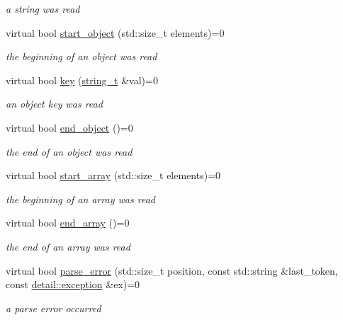 \begin{DoxyCompactItemize}
\begin{DoxyCompactList}\small\item\em a string was read \end{DoxyCompactList}\item 
virtual bool \hyperlink{structnlohmann_1_1json__sax_a0671528b0debb5a348169d61f0382a0f}{start\+\_\+object} (std\+::size\+\_\+t elements)=0
\begin{DoxyCompactList}\small\item\em the beginning of an object was read \end{DoxyCompactList}\item 
virtual bool \hyperlink{structnlohmann_1_1json__sax_a2e0c7ecd80b18d18a8cc76f71cfc2028}{key} (\hyperlink{structnlohmann_1_1json__sax_ae01977a9f3c5b3667b7a2929ed91061e}{string\+\_\+t} \&val)=0
\begin{DoxyCompactList}\small\item\em an object key was read \end{DoxyCompactList}\item 
virtual bool \hyperlink{structnlohmann_1_1json__sax_ad0c722d53ff97be700ccf6a9468bd456}{end\+\_\+object} ()=0
\begin{DoxyCompactList}\small\item\em the end of an object was read \end{DoxyCompactList}\item 
virtual bool \hyperlink{structnlohmann_1_1json__sax_a5c53878cf08d463eb4e7ca0270532572}{start\+\_\+array} (std\+::size\+\_\+t elements)=0
\begin{DoxyCompactList}\small\item\em the beginning of an array was read \end{DoxyCompactList}\item 
virtual bool \hyperlink{structnlohmann_1_1json__sax_a235ee975617f28e6a996d1e36a282312}{end\+\_\+array} ()=0
\begin{DoxyCompactList}\small\item\em the end of an array was read \end{DoxyCompactList}\item 
virtual bool \hyperlink{structnlohmann_1_1json__sax_a60287e3bd85f489e04c83f7e3b76e613}{parse\+\_\+error} (std\+::size\+\_\+t position, const std\+::string \&last\+\_\+token, const \hyperlink{classnlohmann_1_1detail_1_1exception}{detail\+::exception} \&ex)=0
\begin{DoxyCompactList}\small\item\em a parse error occurred \end{DoxyCompactList}\end{DoxyCompactItemize}


